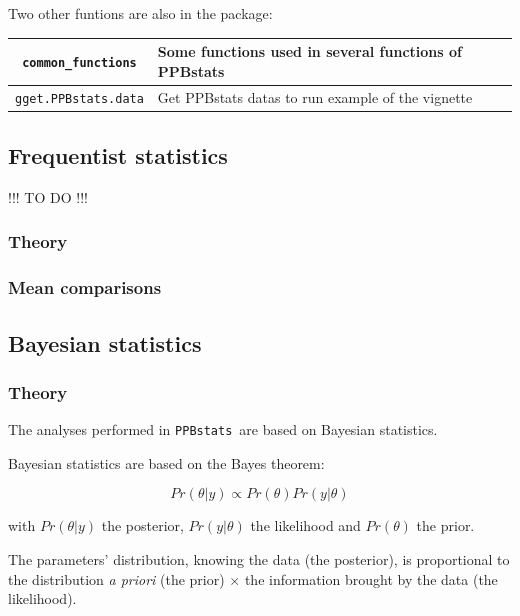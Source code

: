 \documentclass{article}\usepackage[]{graphicx}\usepackage[]{color}
\newcommand{\pack}{\texttt{PPBstats}}
\begin{document}
Two other funtions are also in the package:


\begin{table}[H]\begin{center}
\begin{tabular}{cl}
\hline
\texttt{common\_functions} & Some functions used in several functions of PPBstats \\ \hline
\texttt{gget.PPBstats.data} & Get PPBstats datas to run example of the vignette \\ \hline
\end{tabular}
\end{center}\end{table}



\subsection{Frequentist statistics}

!!! TO DO !!!

\subsubsection{Theory}

\subsubsection{Mean comparisons}

\subsection{Bayesian statistics}
\label{section_bayes}

\subsubsection{Theory}

The analyses performed in \pack~are based on Bayesian statistics.

Bayesian statistics are based on the Bayes theorem:

\begin{displaymath}
Pr(\theta|y) \propto Pr(\theta) Pr(y|\theta)
\end{displaymath}

with 
$Pr(\theta|y)$ the posterior, 
$Pr(y|\theta)$ the likelihood and 
$Pr(\theta)$ the prior.

The parameters' distribution, knowing the data (the posterior), is proportional to the distribution \textit{a  priori} (the prior) $\times$ the information brought by the data (the likelihood).
\end{document}

